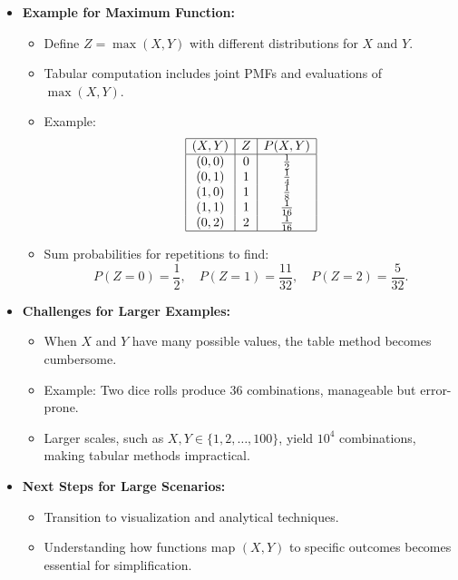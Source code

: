 \documentclass{article}
\begin{document}
\begin{itemize}
  \item \textbf{Example for Maximum Function:}
    \begin{itemize}
      \item Define $Z = \max(X, Y)$ with different distributions for $X$ and $Y$.
      \item Tabular computation includes joint PMFs and evaluations of $\max(X, Y)$.
      \item Example:
        \[
          \begin{array}{|c|c|c|c|}
            \hline
            (X, Y) & Z & P(X, Y) \\ \hline
            (0, 0) & 0 & \frac{1}{2} \\
            (0, 1) & 1 & \frac{1}{4} \\
            (1, 0) & 1 & \frac{1}{8} \\
            (1, 1) & 1 & \frac{1}{16} \\
            (0, 2) & 2 & \frac{1}{16} \\ \hline
          \end{array}
        \]
      \item Sum probabilities for repetitions to find:
        \[
          P(Z = 0) = \frac{1}{2}, \quad P(Z = 1) = \frac{11}{32}, \quad P(Z = 2) = \frac{5}{32}.
        \]
    \end{itemize}

  \item \textbf{Challenges for Larger Examples:}
    \begin{itemize}
      \item When $X$ and $Y$ have many possible values, the table method becomes cumbersome.
      \item Example: Two dice rolls produce 36 combinations, manageable but error-prone.
      \item Larger scales, such as $X, Y \in \{1, 2, \dots, 100\}$, yield $10^4$ combinations, making tabular methods impractical.
    \end{itemize}

  \item \textbf{Next Steps for Large Scenarios:}
    \begin{itemize}
      \item Transition to visualization and analytical techniques.
      \item Understanding how functions map $(X, Y)$ to specific outcomes becomes essential for simplification.
    \end{itemize}
\end{itemize}
\end{document}
